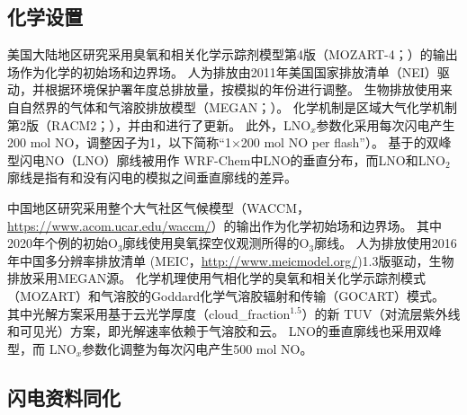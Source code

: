 \subsection{化学设置}

美国大陆地区研究采用臭氧和相关化学示踪剂模型第4版（MOZART-4；\citet{Emmons.2010}）的输出场作为化学的初始场和边界场。
人为排放由2011年美国国家排放清单（NEI）驱动，并根据环境保护署年度总排放量，按模拟的年份进行调整\citep{EPA.2015}。
生物排放使用来自自然界的气体和气溶胶排放模型（MEGAN；\citet{Guenther.2006}）。
化学机制是区域大气化学机制第2版（RACM2；\citet{Goliff.2013}），并由\citet{Browne.2014}和\citet{Schwantes.2015}进行了更新。
此外，LNO$_x$参数化采用每次闪电产生200 mol NO，调整因子为1，以下简称“1$\times$200 mol NO per flash”）。
基于\citet{Ott.2010}的双峰型闪电NO（LNO）廓线\citep{Laughner.2017}被用作 WRF-Chem中LNO的垂直分布，而LNO和LNO$_2$廓线是指有和没有闪电的模拟之间垂直廓线的差异。

中国地区研究采用整个大气社区气候模型（WACCM，\url{https://www.acom.ucar.edu/waccm/}）的输出作为化学初始场和边界场。
其中2020年个例的初始O$_3$廓线使用臭氧探空仪观测所得的O$_3$廓线。
人为排放使用2016年中国多分辨率排放清单 (MEIC，\url{http://www.meicmodel.org/})1.3版驱动，生物排放采用MEGAN源。
化学机理使用气相化学的臭氧和相关化学示踪剂模式（MOZART）和气溶胶的Goddard化学气溶胶辐射和传输（GOCART）模式\citep{Pfister.2011}。
其中光解方案采用基于云光学厚度（cloud\_fraction$^{1.5}$）的新 TUV（对流层紫外线和可见光）方案，即光解速率依赖于气溶胶和云。
LNO的垂直廓线也采用双峰型\citep{Laughner.2017}，而 LNO$_x$参数化调整为每次闪电产生500 mol NO\citep{Zhu.2019}。



\subsection{闪电资料同化} \label{sect:lightning_assimilation}

